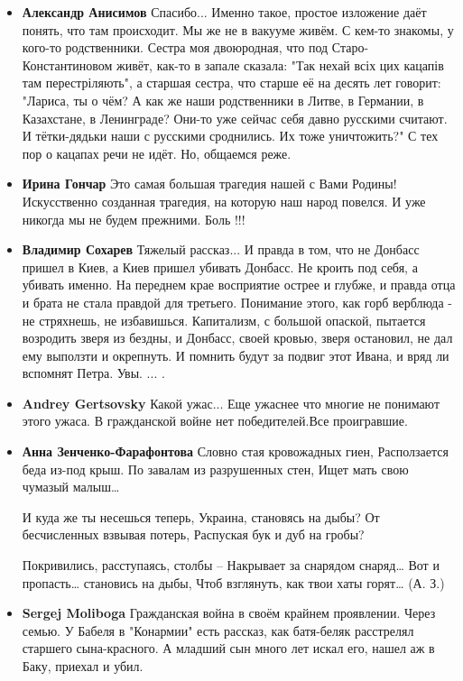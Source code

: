 \begin{itemize}
\item \textbf{Александр Анисимов}
Спасибо... Именно такое, простое изложение даёт понять, что там происходит. Мы же не в вакууме живём. С кем-то знакомы, у кого-то родственники. Сестра моя двоюродная, что под Старо-Константиновом живёт, как-то в запале сказала: "Так нехай всіх цих кацапів там перестріляють", а старшая сестра, что старше её на десять лет говорит: "Лариса, ты о чём? А как же наши родственники в Литве, в Германии, в Казахстане, в Ленинграде? Они-то уже сейчас себя давно русскими считают. И тётки-дядьки наши с русскими сроднились. Их тоже уничтожить?" С тех пор о кацапах речи не идёт. Но, общаемся реже.

\item \textbf{Ирина Гончар}
Это самая большая трагедия нашей с Вами Родины!
Искусственно созданная трагедия, на которую наш народ повелся. И уже никогда мы не будем прежними. Боль !!! 

\item \textbf{Владимир Сохарев}
Тяжелый рассказ... И правда в том, что не Донбасс пришел в Киев, а Киев пришел убивать Донбасс. Не кроить под себя, а убивать именно. На переднем крае восприятие острее и глубже, и правда отца и брата не стала правдой для третьего. Понимание этого, как горб верблюда - не стряхнешь, не избавишься. Капитализм, с большой опаской, пытается возродить зверя из бездны, и Донбасс, своей кровью, зверя остановил, не дал ему выползти и окрепнуть. И помнить будут за подвиг этот Ивана, и вряд ли вспомнят Петра. Увы. ... .

\item \textbf{Andrey Gertsovsky}
Какой ужас...
Еще ужаснее что многие не понимают этого ужаса.
В гражданской войне нет победителей.Все проигравшие.

\item \textbf{Анна Зенченко-Фарафонтова}
\obeycr
Словно стая кровожадных гиен,
Расползается беда из-под крыш.
По завалам из разрушенных стен,
Ищет мать свою чумазый малыш…

И куда же ты несешься теперь,
Украина, становясь на дыбы?
От бесчисленных взвывая потерь,
Распуская бук и дуб на гробы?

Покривились, расступаясь, столбы –
Накрывает за снарядом снаряд…
Вот и пропасть… становись на дыбы,
Чтоб взглянуть, как твои хаты горят…
(А. З.)
				\restorecr

\item \textbf{Sergej Moliboga}
Гражданская война в своём крайнем проявлении. Через семью. У Бабеля в "Конармии" есть рассказ, как батя-беляк расстрелял старшего сына-красного. А младший сын много лет искал его, нашел аж в Баку, приехал и убил.


\end{itemize}
